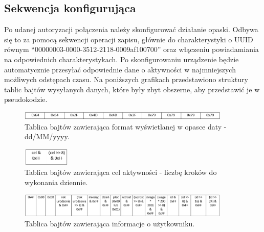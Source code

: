 \subsection{Sekwencja konfigurująca}
Po udanej autoryzacji połączenia należy skonfigurować działanie opaski. Odbywa się to za pomocą sekwencji operacji zapisu, głównie do charakterystyki o UUID równym ``00000003-0000-3512-2118-0009af100700'' oraz włączeniu powiadamiania na odpowiednich charakterystykach. Po skonfigurowaniu urządzenie będzie automatycznie przesyłać odpowiednie dane o aktywności w najmniejszych możliwych odstępach czasu. Na poniższych grafikach przedstawiono struktury tablic bajtów wysyłanych danych, które były zbyt obszerne, aby przedstawić je w pseudokodzie. 
\begin{figure}[H]
    \begin{center}
        \includegraphics[width=0.90\textwidth]{DateFormatBA.png}
    \end{center}
    \caption{{\color{dgray}Tablica bajtów zawierająca format wyświetlanej w opasce daty - dd/MM/yyyy.}} \label{dateFormat}
\end{figure}
\begin{figure}[H]
    \begin{center}
        \includegraphics[width=0.20\textwidth]{FitnessGoalBA.png}
    \end{center}
    \caption{{\color{dgray}Tablica bajtów zawierająca cel aktywności - liczbę kroków do wykonania dziennie.}} \label{fitnessGoal}
\end{figure}
\begin{figure}[H]
    \begin{center}
        \includegraphics[width=0.90\textwidth]{UserInfoBA.png}
    \end{center}
    \caption{{\color{dgray}Tablica bajtów zawierająca informacje o użytkowniku.}} \label{userInfo}
\end{figure}

